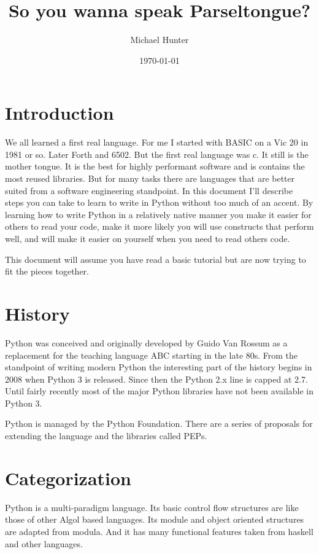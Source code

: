 \documentclass[]{article}
\title{So you wanna speak Parseltongue?}
\author{Michael Hunter}
\date{\today}
\begin{document}
\maketitle

\tableofcontents

\section{Introduction}

We all learned a first real language. For me I started with BASIC on a
Vic 20 in 1981 or so. Later Forth and 6502. But the first real
language was c. It still is the mother tongue. It is the best for
highly performant software and is contains the most reused libraries.
But for many tasks there are languages that are better suited from a
software engineering standpoint. In this document I'll describe steps
you can take to learn to write in Python without too much of an accent.
By learning how to write Python in a relatively native manner you make
it easier for others to read your code, make it more likely you will use
constructs that perform well, and will make it easier on yourself when
you need to read others code.

This document will assume you have read a basic tutorial but are now
trying to fit the pieces together.

\section{History}

Python was conceived and originally developed by Guido Van Rossum as a
replacement for the teaching language ABC starting in the late 80s.
From the standpoint of writing modern Python the interesting part of
the history begins in 2008 when Python 3 is released. Since then the
Python 2.x line is capped at 2.7. Until fairly recently most of the
major Python libraries have not been available in Python 3.

Python is managed by the Python Foundation. There are a series of
proposals for extending the language and the libraries called PEPs.

\section{Categorization}

Python is a multi-paradigm language. Its basic control flow structures
are like those of other Algol based languages. Its module and object
oriented structures are adapted from modula. And it has many functional
features taken from haskell and other languages.
\end{document}
